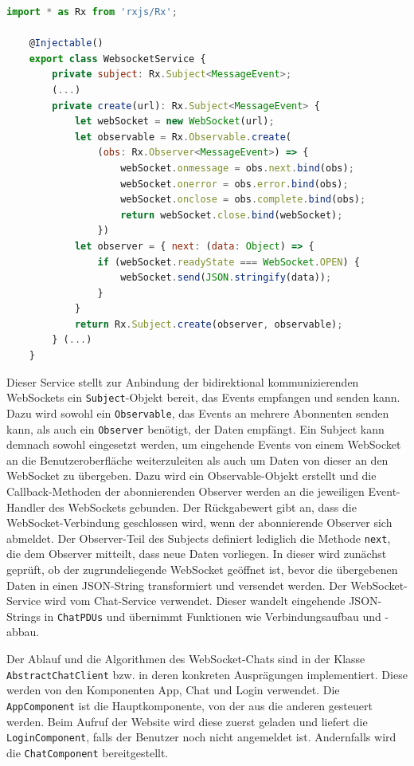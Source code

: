 \documentclass[11pt,a4paper,titlepage]{scrartcl}
\numberwithin{equation}{section}
\begin{document}
\begin{lstlisting}[frame=single, language=JavaScript, caption=WebSocket-Client: WebSocket-Service, label=lst:wsClientWS]
	import * as Rx from 'rxjs/Rx';

	@Injectable()
	export class WebsocketService {
		private subject: Rx.Subject<MessageEvent>;
		(...)
		private create(url): Rx.Subject<MessageEvent> {
			let webSocket = new WebSocket(url);
			let observable = Rx.Observable.create(
				(obs: Rx.Observer<MessageEvent>) => {
					webSocket.onmessage = obs.next.bind(obs);
					webSocket.onerror = obs.error.bind(obs);
					webSocket.onclose = obs.complete.bind(obs);
					return webSocket.close.bind(webSocket);
				})
			let observer = { next: (data: Object) => {
				if (webSocket.readyState === WebSocket.OPEN) {
					webSocket.send(JSON.stringify(data));
				}
			}
			return Rx.Subject.create(observer, observable);
		} (...)
	}
\end{lstlisting}

\noindent Dieser Service stellt zur Anbindung der bidirektional kommunizierenden WebSockets ein \texttt{Subject}-Objekt bereit, das Events empfangen und senden kann. Dazu wird sowohl ein \texttt{Observable}, das Events an mehrere Abonnenten senden kann, als auch ein \texttt{Observer} benötigt, der Daten empfängt. Ein Subject kann demnach sowohl eingesetzt werden, um eingehende Events von einem WebSocket an die Benutzeroberfläche weiterzuleiten als auch um Daten von dieser an den WebSocket zu übergeben. Dazu wird ein Observable-Objekt erstellt und die Callback-Methoden der abonnierenden Observer werden an die jeweiligen Event-Handler des WebSockets gebunden. Der Rückgabewert gibt an, dass die WebSocket-Verbindung geschlossen wird, wenn der abonnierende Observer sich abmeldet. Der Observer-Teil des Subjects definiert lediglich die Methode \texttt{next}, die dem Observer mitteilt, dass neue Daten vorliegen. In dieser wird zunächst geprüft, ob der zugrundeliegende WebSocket geöffnet ist, bevor die übergebenen Daten in einen JSON-String transformiert und versendet werden. Der WebSocket-Service wird vom Chat-Service verwendet. Dieser wandelt eingehende JSON-Strings in \texttt{ChatPDUs} und übernimmt Funktionen wie Verbindungsaufbau und -abbau.

\noindent Der Ablauf und die Algorithmen des WebSocket-Chats sind in der Klasse \texttt{AbstractChatClient} bzw. in deren konkreten Ausprägungen implementiert. Diese werden von den Komponenten App, Chat und Login verwendet. Die \texttt{AppComponent} ist die Hauptkomponente, von der aus die anderen gesteuert werden. Beim Aufruf der Website wird diese zuerst geladen und liefert die \texttt{LoginComponent}, falls der Benutzer noch nicht angemeldet ist. Andernfalls wird die \texttt{ChatComponent} bereitgestellt. \medskip
\end{document}
